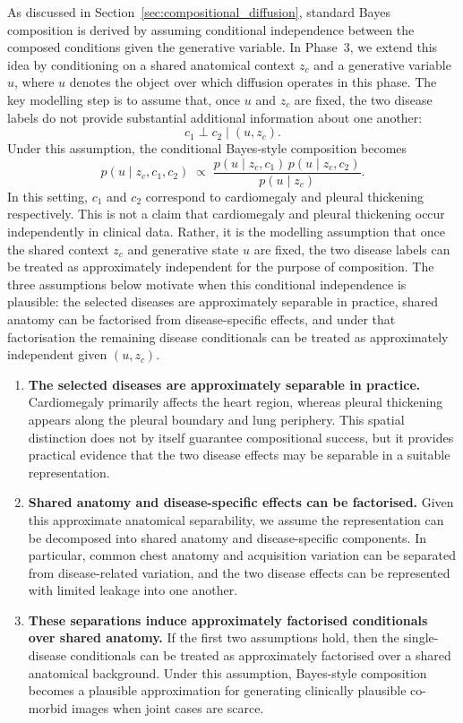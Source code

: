 As discussed in Section~\ref{sec:compositional_diffusion}, standard Bayes composition is derived by assuming conditional independence between the composed conditions given the generative variable. In Phase~3, we extend this idea by conditioning on a shared anatomical context \(z_c\) and a generative variable \(u\), where \(u\) denotes the object over which diffusion operates in this phase. The key modelling step is to assume that, once \(u\) and \(z_c\) are fixed, the two disease labels do not provide substantial additional information about one another:
\[
    c_1 \perp c_2 \mid (u,z_c).
\]
Under this assumption, the conditional Bayes-style composition becomes
\begin{equation}
    p(u \mid z_c, c_1, c_2)
    \;\propto\;
    \frac{p(u \mid z_c, c_1)\,p(u \mid z_c, c_2)}{p(u \mid z_c)}.
    \label{eq:p3_conditional_bayes}
\end{equation}
In this setting, \(c_1\) and \(c_2\) correspond to cardiomegaly and pleural thickening respectively. 
This is not a claim that cardiomegaly and pleural thickening occur independently in clinical data. 
Rather, it is the modelling assumption that once the shared context \(z_c\) and generative state \(u\) are fixed, the two disease labels can be treated as approximately independent for the purpose of composition.
The three assumptions below motivate when this conditional independence is plausible: 
the selected diseases are approximately separable in practice, shared anatomy can be factorised from disease-specific effects, and under that factorisation the remaining disease conditionals can be treated as approximately independent given \((u,z_c)\).
\begin{enumerate}
    \item \textbf{The selected diseases are approximately separable in practice.}
    Cardiomegaly primarily affects the heart region, whereas pleural thickening appears along the pleural boundary and lung periphery. This spatial distinction does not by itself guarantee compositional success, but it provides practical evidence that the two disease effects may be separable in a suitable representation.

    \item \textbf{Shared anatomy and disease-specific effects can be factorised.}
    Given this approximate anatomical separability, we assume the representation can be decomposed into shared anatomy and disease-specific components. In particular, common chest anatomy and acquisition variation can be separated from disease-related variation, and the two disease effects can be represented with limited leakage into one another.

    \item \textbf{These separations induce approximately factorised conditionals over shared anatomy.}
    If the first two assumptions hold, then the single-disease conditionals can be treated as approximately factorised over a shared anatomical background. Under this assumption, Bayes-style composition becomes a plausible approximation for generating clinically plausible co-morbid images when joint cases are scarce.
\end{enumerate}


